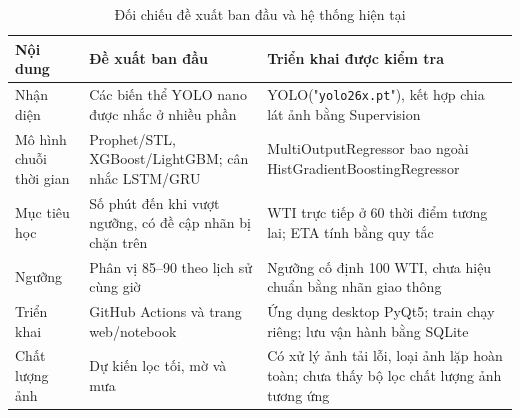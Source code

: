 \begin{table}[htbp]
        \centering
        \caption{Đối chiếu đề xuất ban đầu và hệ thống hiện tại}
        \vspace{0.2cm}
        \begin{tabular}{|p{3.5cm}|p{5.5cm}|p{6.5cm}|}
            \hline
            \textbf{Nội dung} & \textbf{Đề xuất ban đầu} & \textbf{Triển khai được kiểm tra} \\
            \hline
            Nhận diện & Các biến thể YOLO nano được nhắc ở nhiều phần & YOLO("\texttt{yolo26x.pt}"), kết hợp chia lát ảnh bằng Supervision \\
            \hline
            Mô hình chuỗi thời gian & Prophet/STL, XGBoost/LightGBM; cân nhắc LSTM/GRU & MultiOutputRegressor bao ngoài HistGradientBoostingRegressor \\
            \hline
            Mục tiêu học & Số phút đến khi vượt ngưỡng, có đề cập nhãn bị chặn trên & WTI trực tiếp ở 60 thời điểm tương lai; ETA tính bằng quy tắc \\
            \hline
            Ngưỡng & Phân vị 85–90 theo lịch sử cùng giờ & Ngưỡng cố định 100 WTI, chưa hiệu chuẩn bằng nhãn giao thông \\
            \hline
            Triển khai & GitHub Actions và trang web/notebook & Ứng dụng desktop PyQt5; train chạy riêng; lưu vận hành bằng SQLite \\
            \hline
            Chất lượng ảnh & Dự kiến lọc tối, mờ và mưa & Có xử lý ảnh tải lỗi, loại ảnh lặp hoàn toàn; chưa thấy bộ lọc chất lượng ảnh tương ứng \\
            \hline
        \end{tabular}
    \end{table}